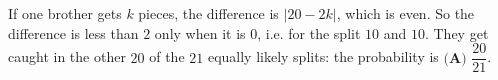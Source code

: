 If one brother gets $k$ pieces, the difference is $|20-2k|$, which is even. So the difference is less than $2$ only when it is $0$, i.e. for the split $10$ and $10$. They get caught in the other $20$ of the $21$ equally likely splits: the probability is $\boxed{\textbf{(A) }\dfrac{20}{21}}$.
